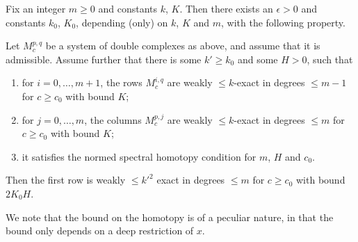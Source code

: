 \begin{proposition}
  \label{spectral}
  \leanok
  Fix an integer $m\geq 0$ and constants $k$, $K$.
  Then there exists an $\epsilon>0$ and constants $k_0$, $K_0$,
  depending (only) on $k$, $K$ and $m$, with the following property.

  Let $M^{p,q}_c$ be a system of double complexes as above,
  and assume that it is admissible.
  Assume further that there is some $k'\geq k_0$ and some $H>0$, such that
  \begin{enumerate}
	  \item for $i=0,\ldots,m+1$, the rows $M^{i,q}_c$ are weakly $\leq k$-exact in degrees $\leq m-1$ for $c\geq c_0$ with bound $K$;
	  \item for $j=0,\ldots,m$, the columns $M^{p,j}_c$ are weakly $\leq k$-exact in degrees $\leq m$ for $c\geq c_0$ with bound $K$;
    \item it satisfies the normed spectral homotopy condition for $m$, $H$ and $c_0$.
  \end{enumerate}
  Then the first row is weakly $\leq k'^2$ exact in degrees $\leq m$ for $c\geq c_0$ with bound $2K_0H$.
\end{proposition}

We note that the bound on the homotopy is of a peculiar nature, in that the bound only depends on a deep restriction of $x$.

